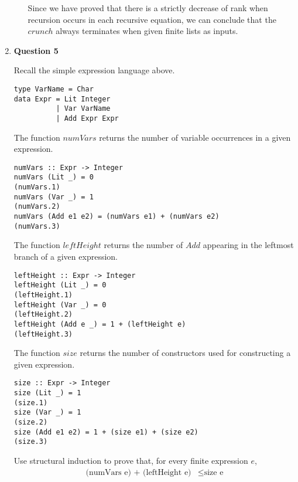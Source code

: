 \documentclass[11pt]{article}
\theoremstyle{definition}
\begin{document}
\begin{enumerate}
\begin{enumerate}
  Since we have proved that there is a strictly decrease of rank when recursion occurs in each recursive equation, we can
  conclude that the $crunch$ always terminates when given finite lists as inputs.

\end{enumerate}

\item[] \textbf{Question 5}

Recall the simple expression language above.

\begin{verbatim}
type VarName = Char
data Expr = Lit Integer
          | Var VarName
          | Add Expr Expr
\end{verbatim}

The function $numVars$ returns the number of variable occurrences in a given expression.

\begin{verbatim}
numVars :: Expr -> Integer
numVars (Lit _) = 0                                         (numVars.1)
numVars (Var _) = 1                                         (numVars.2)
numVars (Add e1 e2) = (numVars e1) + (numVars e2)           (numVars.3)
\end{verbatim}

The function $leftHeight$ returns the number of $Add$ appearing in the leftmost branch of a given expression.

\begin{verbatim}
leftHeight :: Expr -> Integer
leftHeight (Lit _) = 0                                      (leftHeight.1)
leftHeight (Var _) = 0                                      (leftHeight.2)
leftHeight (Add e _) = 1 + (leftHeight e)                   (leftHeight.3)
\end{verbatim}

The function $size$ returns the number of constructors used for constructing a given expression.

\begin{verbatim}
size :: Expr -> Integer
size (Lit _) = 1                                            (size.1)
size (Var _) = 1                                            (size.2)
size (Add e1 e2) = 1 + (size e1) + (size e2)                (size.3)
\end{verbatim}

Use structural induction to prove that, for every finite expression $e$,
\begin{align*} 
\text{(numVars e) + (leftHeight e)} &\leq \text{size e}
\end{align*}


\end{enumerate}
\end{document}
